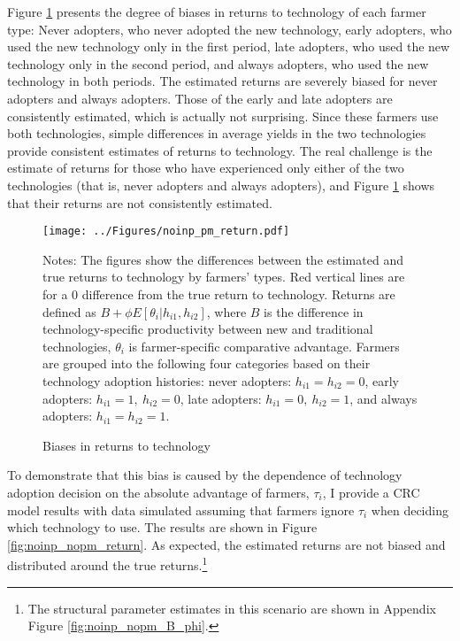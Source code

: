 \documentclass[11pt,letterpaper]{article}
\begin{document}
Figure \ref{fig:noinp_pm_return} presents the degree of biases in returns to technology of each farmer type: 
Never adopters, who never adopted the new technology,
early adopters, who used the new technology only in the first period,
late adopters, who used the new technology only in the second period, and
always adopters, who used the new technology in both periods.
The estimated returns are severely biased for never adopters and always adopters.
Those of the early and late adopters are consistently estimated, which is actually not surprising.
Since these farmers use both technologies, simple differences in average yields in the two technologies provide consistent estimates of returns to technology.
The real challenge is the estimate of returns for those who have experienced only either of the two technologies (that is, never adopters and always adopters), and Figure \ref{fig:noinp_pm_return} shows that their returns are not consistently estimated.

\begin{figure}[H]
  \centering
  \caption{Biases in returns to technology}
  \texttt{[image: ../Figures/noinp\_pm\_return.pdf]}
  \label{fig:noinp_pm_return}
  \footnotesize
  \begin{tablenotes}
    \item Notes:
      The figures show the differences between the estimated and true returns to technology by farmers' types.
      Red vertical lines are for a 0 difference from the true return to technology.
      Returns are defined as $B + \phi E[\theta_i | h_{i1}, h_{i2}]$, where $B$ is the difference in technology-specific productivity between new and traditional technologies, $\theta_i$ is farmer-specific comparative advantage.
      Farmers are grouped into the following four categories based on their technology adoption histories:
      never adopters: $h_{i1} = h_{i2} = 0$, 
      early adopters: $h_{i1} = 1, \ h_{i2} = 0$, 
      late adopters: $h_{i1} = 0, \ h_{i2} = 1$, and
      always adopters: $h_{i1} = h_{i2} = 1$.
  \end{tablenotes}
\end{figure}

To demonstrate that this bias is caused by the dependence of technology adoption decision on the absolute advantage of farmers, $\tau_i$, I provide a CRC model results with data simulated assuming that farmers ignore $\tau_i$ when deciding which technology to use.
The results are shown in Figure \ref{fig:noinp_nopm_return}.
As expected, the estimated returns are not biased and distributed around the true returns.\footnote{
  The structural parameter estimates in this scenario are shown in Appendix Figure \ref{fig:noinp_nopm_B_phi}.
}
\end{document}
